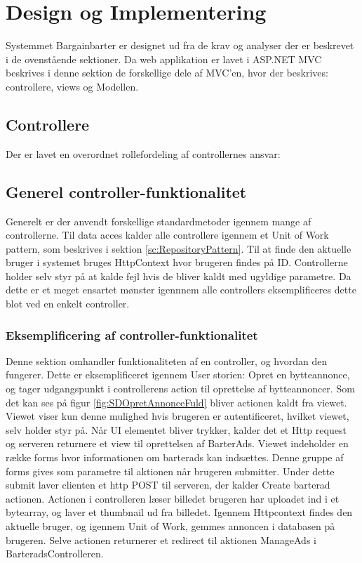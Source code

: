 
\chapter{Design og Implementering}\label{ch:Design}
Systemmet Bargainbarter er designet ud fra de krav og analyser der er beskrevet i de ovenstående sektioner. Da web applikation er lavet i ASP.NET MVC beskrives i denne sektion de forskellige dele af MVC'en, hvor der beskrives: controllere, views og Modellen. 


\section{Controllere}
Der er lavet en overordnet rollefordeling af controllernes ansvar: 







\section{Generel controller-funktionalitet}\label{sc:GenerelControl}


Generelt er der anvendt forskellige standardmetoder igennem mange af controllerne. Til data acces kalder alle controllere igennem et Unit of Work pattern, som beskrives i sektion \ref{sc:RepositoryPattern}. Til at finde den aktuelle bruger i systemet bruges HttpContext hvor brugeren findes på ID. Controllerne holder selv styr på at kalde fejl hvis de bliver kaldt med ugyldige parametre. Da dette er et meget ensartet mønster igennnem alle controllers eksemplificeres dette blot ved en enkelt controller.

\subsection{Eksemplificering af controller-funktionalitet}
Denne sektion omhandler funktionaliteten af en controller, og hvordan den fungerer. Dette er eksemplificeret igennem User storien: Opret en bytteannonce, og tager udgangspunkt i controllerens action til oprettelse af bytteannoncer.
Som det kan ses på figur \ref{fig:SDOpretAnnonceFuld} bliver actionen kaldt fra viewet. Viewet viser kun denne mulighed hvis brugeren er autentificeret, hvilket viewet, selv holder styr på. Når UI elementet bliver trykker, kalder det et Http request og serveren returnere et view til oprettelsen af BarterAds. Viewet indeholder en række forms hvor informationen om barterads kan indsættes. Denne gruppe af forms gives som parametre til aktionen når brugeren submitter. Under dette submit laver clienten et http POST til serveren, der kalder Create barterad actionen. Actionen i controlleren læser billedet brugeren har uploadet ind i et bytearray, og laver et thumbnail ud fra billedet. Igennem Httpcontext findes den aktuelle bruger, og igennem Unit of Work, gemmes annoncen i databasen på brugeren. Selve actionen returnerer et redirect til aktionen ManageAds i BarteradsControlleren. 

